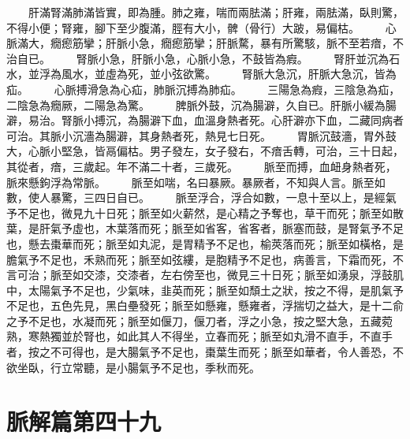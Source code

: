 　　肝滿腎滿肺滿皆實，即為腫。肺之雍，喘而兩胠滿；肝雍，兩胠滿，臥則驚，不得小便；腎雍，腳下至少腹滿，脛有大小，髀（骨行）大跛，易偏枯。
　　心脈滿大，癇瘛筋攣；肝脈小急，癇瘛筋攣；肝脈騖，暴有所驚駭，脈不至若瘖，不治自已。
　　腎脈小急，肝脈小急，心脈小急，不鼓皆為瘕。
　　腎肝並沉為石水，並浮為風水，並虛為死，並小弦欲驚。
　　腎脈大急沉，肝脈大急沉，皆為疝。
　　心脈搏滑急為心疝，肺脈沉搏為肺疝。
　　三陽急為瘕，三陰急為疝，二陰急為癇厥，二陽急為驚。
　　脾脈外鼓，沉為腸澼，久自已。肝脈小緩為腸澼，易治。腎脈小搏沉，為腸澼下血，血溫身熱者死。心肝澼亦下血，二藏同病者可治。其脈小沉濇為腸澼，其身熱者死，熱見七日死。
　　胃脈沉鼓濇，胃外鼓大，心脈小堅急，皆鬲偏枯。男子發左，女子發右，不瘖舌轉，可治，三十日起，其從者，瘖，三歲起。年不滿二十者，三歲死。
　　脈至而搏，血衄身熱者死，脈來懸鉤浮為常脈。
　　脈至如喘，名曰暴厥。暴厥者，不知與人言。脈至如數，使人暴驚，三四日自已。
　　脈至浮合，浮合如數，一息十至以上，是經氣予不足也，微見九十日死；脈至如火薪然，是心精之予奪也，草干而死；脈至如散葉，是肝氣予虛也，木葉落而死；脈至如省客，省客者，脈塞而鼓，是腎氣予不足也，懸去棗華而死；脈至如丸泥，是胃精予不足也，榆莢落而死；脈至如橫格，是膽氣予不足也，禾熟而死；脈至如弦縷，是胞精予不足也，病善言，下霜而死，不言可治；脈至如交漆，交漆者，左右傍至也，微見三十日死；脈至如湧泉，浮鼓肌中，太陽氣予不足也，少氣味，韭英而死；脈至如頹土之狀，按之不得，是肌氣予不足也，五色先見，黑白壘發死；脈至如懸雍，懸雍者，浮揣切之益大，是十二俞之予不足也，水凝而死；脈至如偃刀，偃刀者，浮之小急，按之堅大急，五藏菀熟，寒熱獨並於腎也，如此其人不得坐，立春而死；脈至如丸滑不直手，不直手者，按之不可得也，是大腸氣予不足也，棗葉生而死；脈至如華者，令人善恐，不欲坐臥，行立常聽，是小腸氣予不足也，季秋而死。


\section{脈解篇第四十九}


